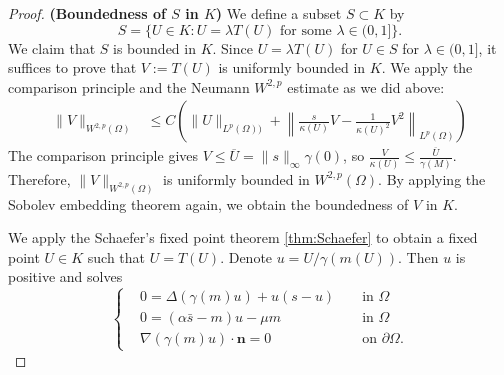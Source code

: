 \documentclass{article}
\begin{document}
\begin{proof}
    \textbf{(Boundedness of $S$ in $K$)} We define a subset
    $S\subset K$ by
    \begin{equation*}
        S = \{U\in K: U=\lambda T(U) \text{ for some }\lambda \in (0,1]\}.
    \end{equation*} We claim that $S$ is bounded in $K$.
    Since $U=\lambda T(U)$ for $U\in S$ for $\lambda\in (0,1]$, it suffices to prove that $V:=T(U)$ is uniformly bounded in $K$.
     We apply the comparison principle and the Neumann $W^{2,p}$ estimate as we did above:
    \begin{align*}
        \|V\|_{W^{2,p}(\Omega)}&\le C\left(\|U\|_{L^{p}(\Omega))}+\left\|\frac{s}{\kappa(U)} V - \frac{1}{\kappa(U)^2}V^2\right\|_{L^{p}(\Omega)}\right)
    \end{align*}  The comparison principle gives $V\le \overline{U}=\|s\|_\infty\gamma(0)$, so $\frac{V}{\kappa(U)}\le \frac{\overline{U}}{\gamma(M)}$. Therefore, $\|V\|_{W^{2,p}(\Omega)}$ is uniformly bounded in $W^{2,p}(\Omega)$. By applying the Sobolev embedding theorem again, we obtain the boundedness of $V$ in $K$.

    We apply the Schaefer's fixed point theorem \ref{thm:Schaefer} to obtain a fixed point $U\in K$ such that $U=T(U)$. Denote $u=U/\gamma(m(U))$. Then $u$ is positive and solves 
    \begin{equation*}
    \left\{\begin{aligned}
        &0=\Delta(\gamma(m)u) + u(s-u) && \text{ in }\Omega\\
        &0=(\alpha\bar s-m)u-\mu m && \text{ in }\Omega\\
        &\nabla(\gamma(m)u)\cdot \boldsymbol{n}=0 && \text{ on }\partial\Omega.
    \end{aligned}\right.
    \end{equation*} 
    
    
   

\end{proof}
\end{document}

